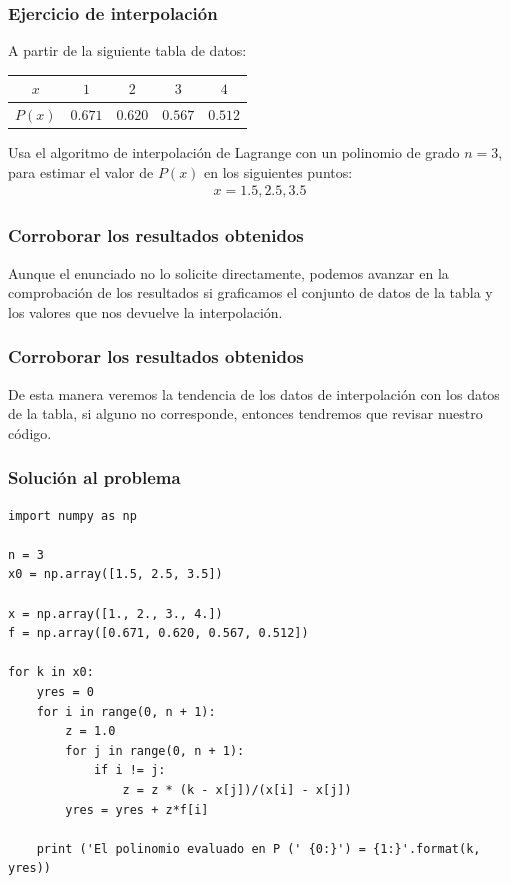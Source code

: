 \documentclass[12pt]{beamer}
\begin{document}
\begin{frame}
\frametitle{Ejercicio de interpolación}
A partir de la siguiente tabla de datos:
\pause
\begin{center}
\renewcommand{\arraystretch}{0.9}
\begin{tabular}{c | c | c | c | c}
$x$ & $1$ & $2$ & $3$ & $4$ \\ \hline
$P (x)$ & $0.671$ & $0.620$ & $0.567$ & $0.512$ \\
\end{tabular}
\end{center}
\pause
Usa el algoritmo de interpolación de Lagrange con un polinomio de grado $n = 3$, para estimar el valor de $P (x)$ en los siguientes puntos:
\\
\medskip
\begin{align*}
x = 1.5, 2.5, 3.5
\end{align*}
\end{frame}
\begin{frame}
\frametitle{Corroborar los resultados obtenidos}
Aunque el enunciado no lo solicite directamente, podemos avanzar en la comprobación de los resultados si graficamos el conjunto de datos de la tabla y los valores que nos devuelve la interpolación.
\end{frame}
\begin{frame}
\frametitle{Corroborar los resultados obtenidos}
De esta manera veremos la tendencia de los datos de interpolación con los datos de la tabla, si alguno no corresponde, entonces tendremos que revisar nuestro código.
\end{frame}
\begin{frame}
\frametitle{Solución al problema}
\begin{lstlisting}[caption=Código para la interpolación de Lagrange, basicstyle=\linespread{0.9}\ttfamily\small, columns=fullflexible]
import numpy as np

n = 3
x0 = np.array([1.5, 2.5, 3.5])

x = np.array([1., 2., 3., 4.])
f = np.array([0.671, 0.620, 0.567, 0.512])

for k in x0:
    yres = 0
    for i in range(0, n + 1):
        z = 1.0
        for j in range(0, n + 1):
            if i != j:
                z = z * (k - x[j])/(x[i] - x[j])
        yres = yres + z*f[i]
    
    print ('El polinomio evaluado en P (' {0:}') = {1:}'.format(k,  yres))
\end{lstlisting}
\end{frame}
\end{document}
